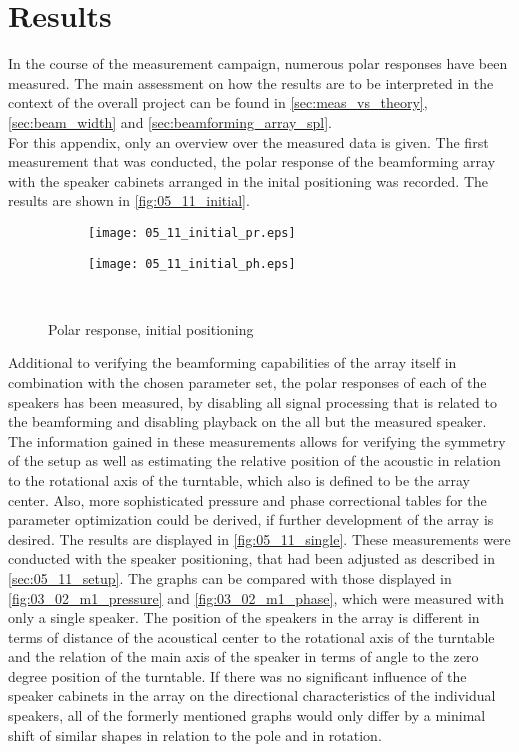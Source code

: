 \section*{Results}\label{sec:05_11_results}
In the course of the measurement campaign, numerous polar responses have been measured. The main assessment on how the results are to be interpreted in the context of the overall project can be found in \autoref{sec:meas_vs_theory}, \ref{sec:beam_width} and \ref{sec:beamforming_array_spl}.\\
For this appendix, only an overview over the measured data is given.
The first measurement that was conducted, the polar response of the beamforming array with the speaker cabinets arranged in the inital positioning was recorded. The results are shown in \autoref{fig:05_11_initial}.
\begin{figure}[h]
\begin{subfigure}[c]{0.5\textwidth}
\texttt{[image: 05\_11\_initial\_pr.eps]}
\label{fig:05_11_init_pr}
\end{subfigure}
\begin{subfigure}[c]{0.5\textwidth}
\texttt{[image: 05\_11\_initial\_ph.eps]}
\label{fig:05_11_init_ph}
\end{subfigure}\\
\caption{Polar response, initial positioning}  
\label{fig:05_11_initial}
\end{figure}
Additional to verifying the beamforming capabilities of the array itself in combination with the chosen parameter set, the polar responses of each of the speakers has been measured, by disabling all signal processing that is related to the beamforming and disabling playback on the all but the measured speaker. The information gained in these measurements allows for verifying the symmetry of the setup as well as estimating the relative position of the acoustic in relation to the rotational axis of the turntable, which also is defined to be the array center. Also, more sophisticated pressure and phase correctional tables for the parameter optimization could be derived, if further development of the array is desired. The results are displayed in \autoref{fig:05_11_single}. These measurements were conducted with the speaker positioning, that had been adjusted as described in \autoref{sec:05_11_setup}.
The graphs can be compared with those displayed in \autoref{fig:03_02_m1_pressure} and \ref{fig:03_02_m1_phase}, which were measured with only a single speaker. The position of the speakers in the array is different in terms of distance of the acoustical center to the rotational axis of the turntable and the relation of the main axis of the speaker in terms of angle to the zero degree position of the turntable. If there was no significant influence of the speaker cabinets in the array on the directional characteristics of the individual speakers, all of the formerly mentioned graphs would only differ by a minimal shift of similar shapes in relation to the pole and in rotation. 
